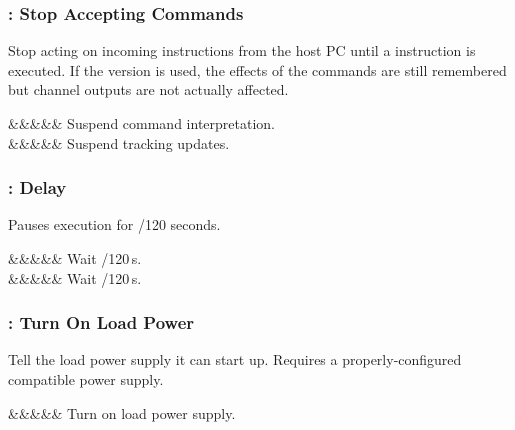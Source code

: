 \documentclass[letterpaper,twoside,onecolumn,openright,final]{memoir}
\begin{document}
{\subsubsection{: Stop Accepting Commands}
Stop acting on incoming instructions from the host PC until a  instruction is executed.
If the  version is used, the effects of the commands are still remembered but
channel outputs are not actually affected.

\begin{opdesc}
   &&&&& Suspend command interpretation.\\
   &&&&& Suspend tracking updates.
\end{opdesc}

\subsubsection{: Delay}
Pauses execution for /120 seconds.

\begin{opdesc}
   &&&&\z{\$}& Wait /120\,s.\\
   &&&&\z{\#}& Wait /120\,s.\\
\end{opdesc}

\subsubsection{: Turn On Load Power}
Tell the load power supply it can start up.  Requires a properly-configured
compatible power supply.

\begin{opdesc}
   &&&&& Turn on load power supply.
\end{opdesc}



}
\end{document}
